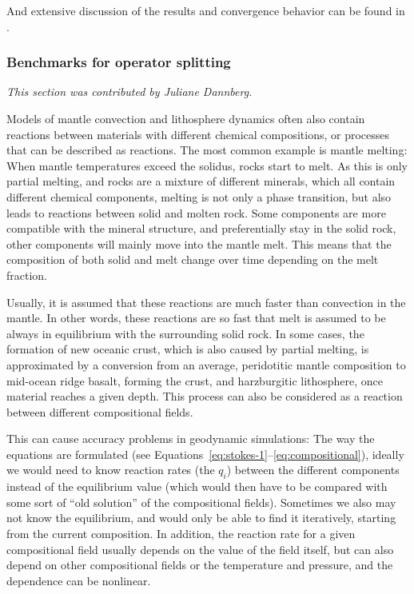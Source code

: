 \documentclass{article}
\begin{document}
And extensive discussion of the results and convergence behavior can be found in \cite{dannberg_melt}.

\subsubsection{Benchmarks for operator splitting}
\label{sec:benchmark-operator_splitting}

\textit{This section was contributed by Juliane Dannberg.}

Models of mantle convection and lithosphere dynamics often also contain reactions between materials with different chemical compositions, or processes that can be described as reactions. 
The most common example is mantle melting: When mantle temperatures exceed the solidus, rocks start to melt. As this is only partial melting, and rocks are a mixture of different minerals, which all contain different chemical components, melting is not only a phase transition, but also leads to reactions between solid and molten rock. Some components are more compatible with the mineral structure, and preferentially stay in the solid rock, other components will mainly move into the mantle melt. This means that the composition of both solid and melt change over time depending on the melt fraction. 

Usually, it is assumed that these reactions are much faster than convection in the mantle. In other words, these reactions are so fast that melt is assumed to be always in equilibrium with the surrounding solid rock. In some cases, the formation of new oceanic crust, which is also caused by partial melting, is approximated by a conversion from an average, peridotitic mantle composition to mid-ocean ridge basalt, forming the crust, and harzburgitic lithosphere, once material reaches a given depth. This process can also be considered as a reaction between different compositional fields. 

This can cause accuracy problems in geodynamic simulations: The way the equations are formulated (see Equations~\ref{eq:stokes-1}--\ref{eq:compositional}), ideally we would need to know reaction rates (the $q_i$) between the different components instead of the equilibrium value (which would then have to be compared with some sort of ``old solution'' of the compositional fields). Sometimes we also may not know the equilibrium, and would only be able to find it iteratively, starting from the current composition. In addition, the reaction rate for a given compositional field usually depends on the value of the field itself, but can also depend on other compositional fields or the temperature and pressure, and the dependence can be nonlinear.
\end{document}

